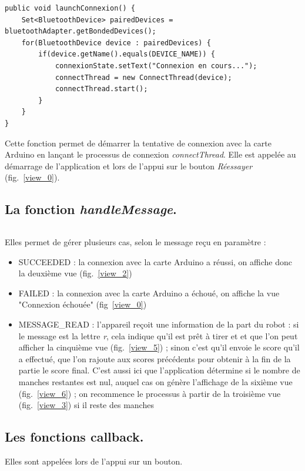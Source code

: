 \begin{lstlisting}
public void launchConnexion() {
	Set<BluetoothDevice> pairedDevices = bluetoothAdapter.getBondedDevices();
	for(BluetoothDevice device : pairedDevices) {
		if(device.getName().equals(DEVICE_NAME)) {
			connexionState.setText("Connexion en cours...");
			connectThread = new ConnectThread(device);
			connectThread.start();
		}
	}
}
\end{lstlisting}
Cette fonction permet de démarrer la tentative de connexion avec la carte Arduino en lançant le processus de connexion \emph{connectThread}. Elle est appelée au démarrage de l'application et lors de l'appui sur le bouton \emph{Réessayer} (fig.~\ref{view_0}). \\

\subsection{La fonction \emph{handleMessage}.}

\begin{lstlisting}
\end{lstlisting}
Elles permet de gérer plusieurs cas, selon le message reçu en paramètre :
\begin{itemize}
	\item SUCCEEDED : la connexion avec la carte Arduino a réussi, on affiche donc la deuxième vue (fig.~\ref{view_2})
	\item FAILED : la connexion avec la carte Arduino a échoué, on affiche la vue "Connexion échouée" (fig~\ref{view_0})
	\item MESSAGE\_READ : l'appareil reçoit une information de la part du robot : si le message est la lettre \emph{r}, cela indique qu'il est prêt à tirer et et que l'on peut afficher la cinquième vue (fig.~\ref{view_5}) ; sinon c'est qu'il envoie le score qu'il a effectué, que l'on rajoute aux scores précédents pour obtenir à la fin de la partie le score final. C'est aussi ici que l'application détermine si le nombre de manches restantes est nul, auquel cas on génère l'affichage de la sixième vue (fig.~\ref{view_6}) ; on recommence le processus à partir de la troisième vue (fig.~\ref{view_3}) si il reste des manches
\end{itemize}

\subsection{Les fonctions callback.}

Elles sont appelées lors de l'appui sur un bouton.

